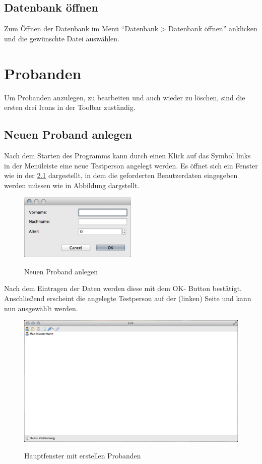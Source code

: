 \documentclass[11pt,accentcolor=tud2a,colorback,noheadingspace]{tudreport}
\begin{document}
\section{Datenbank öffnen}
\label{database:datenbank-offnen}
Zum Öffnen der Datenbank im Menü ``Datenbank \textgreater{} Datenbank öffnen'' 
anklicken und die gewünschte Datei auswählen.


\chapter{Probanden}
\label{probands:probanden}
\label{probands::doc}

Um Probanden anzulegen, zu bearbeiten und auch wieder zu löschen, sind die 
ersten drei Icons in der Toolbar zuständig.

\section{Neuen Proband anlegen}
\label{probands:neuen-proband-anlegen}
Nach dem Starten des Programms kann durch einen Klick auf das Symbol links 
in der Menüleiste eine neue Testperson angelegt werden.
Es öffnet sich ein Fenster wie in der \ref{fig:proband-create} dargestellt, in 
dem die geforderten Benutzerdaten eingegeben werden müssen wie in Abbildung 
dargstellt.

\begin{figure}[H]
	\centering
	\includegraphics[width=0.5\textwidth]{person_dialog.png}
	\label{fig:proband-create}
	\caption{Neuen Proband anlegen}
\end{figure}

Nach dem Eintragen der Daten werden diese mit dem OK- Button bestätigt. 
Anschließend erscheint die angelegte Testperson auf der (linken) Seite und 
kann nun ausgewählt werden.

\begin{figure}[H]
	\includegraphics[width=\textwidth]{person_created.png}
	\label{fig:proband-created}
	\caption{Hauptfenster mit erstellen Probanden}
\end{figure}
\end{document}
